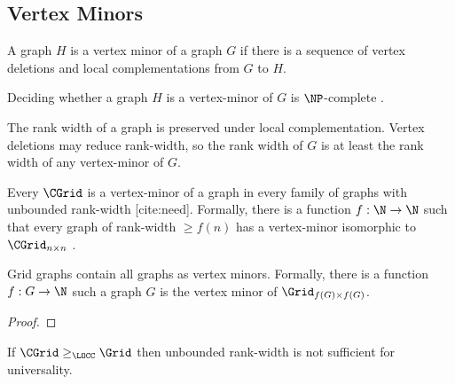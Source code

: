 \subsection{Vertex Minors}

\begin{definition}
A graph $H$ is a vertex minor of a graph $G$ if there is a sequence of vertex deletions and local complementations from $G$ to $H$.
\end{definition}


\begin{theorem}
Deciding whether a graph $H$ is a vertex-minor of $G$ is $\NP$-complete \cite{vertex-minor-np}.
\end{theorem}

\begin{definition}
\end{definition}

\begin{fact}
The rank width of a graph is preserved under local complementation. Vertex deletions may reduce rank-width, so the rank width of $G$ is at least the rank width of any vertex-minor of $G$.
\end{fact}

\begin{theorem}
Every $\CGrid$ is a vertex-minor of a graph in every family of graphs with unbounded rank-width [cite:need]. Formally, there is a function $f: \N \to \N$ such that every graph of rank-width $\geq f(n)$ has a vertex-minor isomorphic to $\CGrid_{n \times n}$ \cite{grid-theorem}.
\end{theorem}

\begin{theorem}
Grid graphs contain all graphs as vertex minors. Formally, there is a function $f: G \to \N$ such a graph $G$ is the vertex minor of $\Grid_{f(G) \times f(G)}$.
\begin{proof}
\end{proof}
\end{theorem}

\begin{theorem}
If $\CGrid \geq_\LOCC \Grid$ then unbounded rank-width is not sufficient for universality.
\end{theorem}